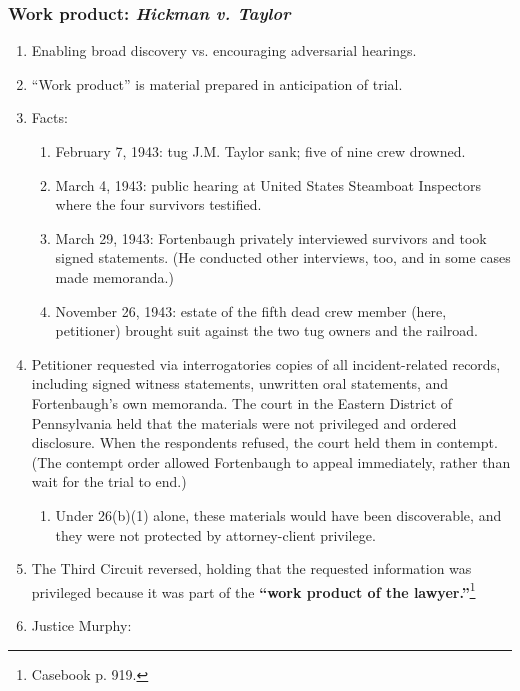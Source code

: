 \subsubsection{Work product: \emph{Hickman v. Taylor}}

\begin{enumerate}
    \item Enabling broad discovery vs. encouraging adversarial hearings.
    \item ``Work product'' is material prepared in anticipation of trial.
    \item Facts:
    \begin{enumerate}
        \item February 7, 1943: tug J.M. Taylor sank; five of nine crew 
        drowned.
        \item March 4, 1943: public hearing at United States Steamboat 
        Inspectors where the four survivors testified.
        \item March 29, 1943: Fortenbaugh privately interviewed survivors and 
        took signed statements. (He conducted other interviews, too, and in 
        some cases made memoranda.)
        \item November 26, 1943: estate of the fifth dead crew member (here, 
        petitioner) brought suit against the two tug owners and the railroad.
    \end{enumerate}
    \item Petitioner requested via interrogatories copies of all 
    incident-related records, including signed witness statements, unwritten 
    oral statements, and Fortenbaugh's own memoranda. The court in the Eastern 
    District of Pennsylvania held that the materials were not privileged and 
    ordered disclosure. When the respondents refused, the court held them in 
    contempt. (The contempt order allowed Fortenbaugh to appeal immediately, 
    rather than wait for the trial to end.)
    \begin{enumerate}
        \item Under 26(b)(1) alone, these materials would have been 
        discoverable, and they were not protected by attorney-client 
        privilege.
    \end{enumerate}
    \item The Third Circuit reversed, holding that the requested information 
    was privileged because it was part of the \textbf{``work product of the 
    lawyer.''}\footnote{Casebook p. 919.}
    \item Justice Murphy:

\end{enumerate}
